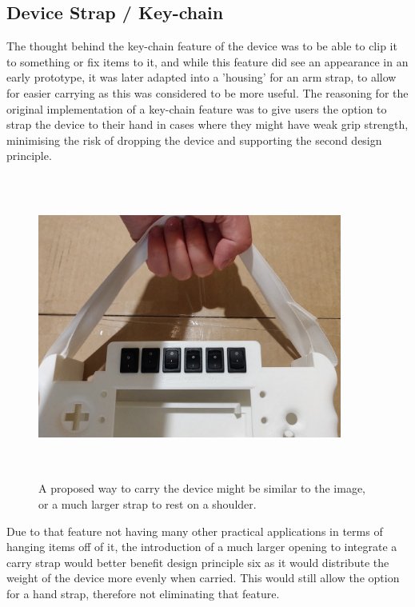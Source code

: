 \subsection{Device Strap / Key-chain}

The thought behind the key-chain feature of the device was to be able to clip it to something or fix items to it, and while this feature did see an appearance in an early prototype, it was later adapted into a 'housing' for an arm strap, to allow for easier carrying as this was considered to be more useful.
The reasoning for the original implementation of a key-chain feature was to give users the option to strap the device to their hand in cases where they might have weak grip strength, minimising the risk of dropping the device and supporting the second design principle.

\begin{figure} [h]
    \centering
    \includegraphics[width=10cm,height=10cm,keepaspectratio]{Figures/carry_strap.png}
    \caption{A proposed way to carry the device might be similar to the image, or a much larger strap to rest on a shoulder.}
    \label{fig:Carry}
\end{figure}

Due to that feature not having many other practical applications in terms of hanging items off of it, the introduction of a much larger opening to integrate a carry strap would better benefit design principle six as it would distribute the weight of the device more evenly when carried.
This would still allow the option for a hand strap, therefore not eliminating that feature.
 
